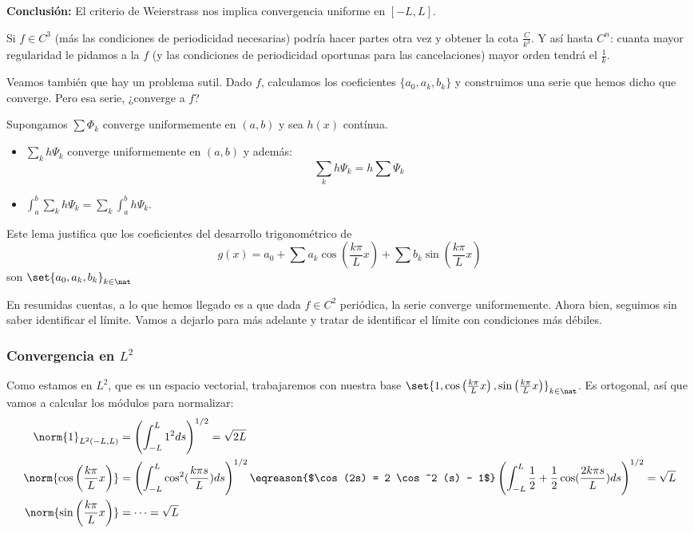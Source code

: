 		\noindent \textbf{Conclusión:} El criterio de Weierstrass nos implica convergencia uniforme en $[-L,L]$.

		\obs Si $f \in C^3$ (más las condiciones de periodicidad necesarias) podría hacer partes otra vez y obtener la cota $\frac{C}{k^3}$. Y así hasta $C^n$: cuanta mayor regularidad le pidamos a la $f$ (y las condiciones de periodicidad oportunas para las cancelaciones) mayor orden tendrá el $\frac{1}{k}$.


		Veamos también que hay un problema sutil. Dado $f$, calculamos los coeficientes $\{a_0,a_k,b_k\}$ y construimos una serie que hemos dicho que converge. Pero esa serie, ¿converge a $f$?

		\begin{lemma}
			Supongamos $\sum \Phi_k$ converge uniformemente en $(a,b)$ y sea $h(x)$ contínua.

			\begin{itemize}
				\item $\sum_k h \Psi_k$ converge uniformemente en $(a,b)$ y además:
				\[ \sum_k h \Psi_k = h \sum \Psi_k\]

				\item $\displaystyle \int_a^b \sum_k h \Psi_k = \sum_k \int_a^b h \Psi_k$.
			\end{itemize}

		\end{lemma}

		Este lema justifica que los coeficientes del desarrollo trigonométrico de
		$$g(x) = a_0 + \sum a_k \cos \left( \frac{k \pi}{L} x \right) + \sum b_k \sin \left( \frac{k \pi}{L} x \right) $$
		son $\set{a_0,a_k,b_k}_{k \in \nat}$

		En resumidas cuentas, a lo que hemos llegado es a que dada $f \in C^2$ periódica, la serie converge uniformemente. Ahora bien, seguimos sin saber identificar el límite. Vamos a dejarlo para más adelante y tratar de identificar el límite con condiciones más débiles.

		\subsubsection{Convergencia en $L^2$}

		Como estamos en $L^2$, que es un espacio vectorial, trabajaremos con nuestra base $\set{1, \cos \left( \frac{k \pi}{L} x \right), \sin \left( \frac{k \pi}{L} x \right)}_{k \in \nat}$. Es ortogonal, así que vamos a calcular los módulos para normalizar:
		\begin{align*}
		\norm{1}_{L^2(-L,L)} &= \left( \int_{-L}^{L} 1^2 ds \right)^{1/2} = \sqrt{2L}\\
		\norm{\cos \left( \frac{k \pi}{L} x \right)} &= \left( \int_{-L}^{L} \cos^2 (\frac{k\pi s}{L}) ds \right)^{1/2} \eqreason{$\cos(2s) = 2 \cos^2 (s) - 1$} \left( \int_{-L}^{L} \frac{1}{2} + \frac{1}{2} \cos (\frac{2 k \pi s}{L}) ds \right)^{1/2} = \sqrt{L} \\
		\norm{\sin \left( \frac{k \pi}{L} x \right)} &= \dots = \sqrt{L}
		\end{align*}

